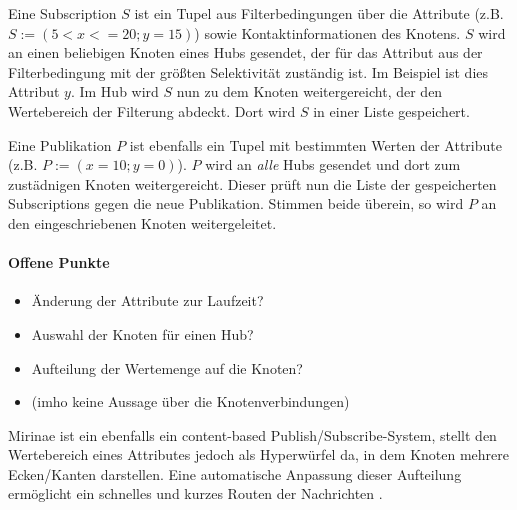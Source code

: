 Eine Subscription $S$ ist ein Tupel aus Filterbedingungen über die Attribute (z.B. $S := (5 < x <= 20; y = 15)$) sowie Kontaktinformationen des Knotens. $S$ wird an einen beliebigen Knoten eines Hubs gesendet, der für das Attribut aus der Filterbedingung mit der größten Selektivität zuständig ist. Im Beispiel ist dies Attribut $y$. Im Hub wird $S$ nun zu dem Knoten weitergereicht, der den Wertebereich der Filterung abdeckt. Dort wird $S$ in einer Liste gespeichert.

Eine Publikation $P$ ist ebenfalls ein Tupel mit bestimmten Werten der Attribute (z.B. $P := (x = 10; y = 0)$). $P$ wird an \emph{alle} Hubs gesendet und dort zum zustädnigen Knoten weitergereicht. Dieser prüft nun die Liste der gespeicherten Subscriptions gegen die neue Publikation. Stimmen beide überein, so wird $P$ an den eingeschriebenen Knoten weitergeleitet.

\paragraph*{Offene Punkte}
\begin{itemize}
\item Änderung der Attribute zur Laufzeit?
\item Auswahl der Knoten für einen Hub?
\item Aufteilung der Wertemenge auf die Knoten?
\item (imho keine Aussage über die Knotenverbindungen)
\end{itemize}

Mirinae ist ein ebenfalls ein content-based Publish/Subscribe-System, stellt den Wertebereich eines Attributes jedoch als Hyperwürfel da, in dem Knoten mehrere Ecken/Kanten darstellen. Eine automatische Anpassung dieser Aufteilung ermöglicht ein schnelles und kurzes Routen der Nachrichten \cite{Choi2005Mirinae}.
